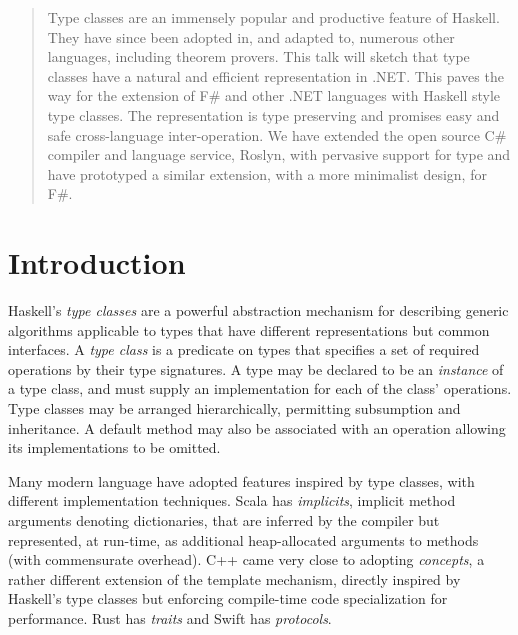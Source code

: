 \documentclass[preprint]{sig-alternate-05-2015}
\begin{document}
\makeatletter
\def\@copyrightspace{\relax}
\makeatother



\maketitle
\begin{abstract}
Type classes are an immensely popular and productive feature of Haskell. They have since been adopted in, and adapted to, numerous other languages, including theorem provers.
This talk will sketch that type classes have a natural and efficient representation in .NET. 
This paves the way for the extension of F\# and other .NET languages with Haskell style type classes. 
The representation is type preserving and promises easy and safe cross-language inter-operation.
We have extended the open source C\# compiler and language service, Roslyn, with pervasive support for type and  have prototyped a similar extension, with a more minimalist design, for F\#.
\end{abstract}




\section{Introduction}


Haskell's \emph{type classes} \cite{peytonjones:h98,WadlerBlott} are a powerful abstraction mechanism for describing generic algorithms applicable to types that have different representations but common interfaces.
A \emph{type class} is a predicate on types that specifies a set of required operations by their type signatures.
A type may be declared to be an \emph{instance} of a type class, and must supply an implementation for each of the class' operations. 
Type classes may be arranged hierarchically, permitting subsumption and inheritance. A default method may also be associated with an operation allowing its implementations to be omitted.

Many modern language have adopted features inspired
by type classes, with different implementation techniques.  Scala has
\emph{implicits}\cite{scalaimplicits}, implicit method arguments denoting dictionaries, that
are inferred by the compiler but represented, at run-time, as additional
heap-allocated arguments to methods (with commensurate overhead).  C++ came very
close to adopting \emph{concepts}\cite{cppconcepts}, a rather different extension of the template mechanism, 
directly inspired by Haskell's type classes but enforcing  compile-time code specialization for performance. Rust has \emph{traits}\cite{Rust} and Swift has
\emph{protocols}\cite{Swift}.
\end{document}
